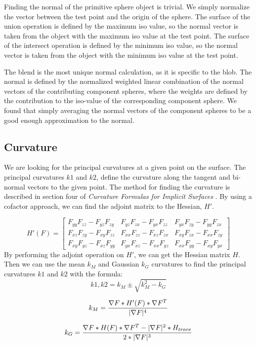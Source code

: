 \documentclass[conference]{acmsiggraph}
\begin{document}
Finding the normal of the primitive sphere object is trivial. We simply
normalize the vector between the test point and the origin of the sphere. The
surface of the union operation is defined by the maximum iso value, so the
normal vector is taken from the object with the maximum iso value at the test
point. The surface of the intersect operation is defined by the minimum iso
value, so the normal vector is taken from the object with the minimum iso value
at the test point.

The blend is the most unique normal calculation, as it is specific to the blob.
The normal is defined by the normalized weighted linear combination of the
normal vectors of the contributing component spheres, where the weights are
defined by the contribution to the iso-value of the corresponding component
sphere\cite{Wyvill}. We found that simply averaging the normal vectors of the
component spheres to be a good enough approximation to the normal.

\subsection{Curvature}
We are looking for the principal curvatures at a given point on the surface.
The principal curvatures $k1$ and $k2$, define the curvature along the tangent
and bi-normal vectors to the given point. The method for finding the curvature
is described in section four of \textit{Curvature Formulas for Implicit
Surfaces} \cite{Goldman2005}. By using a cofactor approach, we can find the adjoint matrix to the
Hessian, $H'$.

$$
H'(F) =
\begin{bmatrix}
	F_{yy}F_{zz} - F_{yz}F_{zy} & F_{yz}F_{zx} - F_{yx}F_{zz} & F_{yx}F_{zy} - F_{yy}F_{zx} \\
	F_{xz}F_{zy} - F_{xy}F_{zz} & F_{xx}F_{zz} - F_{xz}F_{zx} & F_{xy}F_{zx} - F_{xx}F_{zy} \\
	F_{xy}F_{yz} - F_{xz}F_{yy} & F_{yx}F_{xz} - F_{xx}F_{yz} & F_{xx}F_{yy} - F_{xy}F_{yx}
\end{bmatrix}
$$
By performing the adjoint operation on $H'$, we can get the
Hessian matrix $H$. Then we can use the mean $k_M$ and Gaussian $k_G$
curvatures to find
the principal curvatures $k1$ and $k2$ with the formula:
$$k1, k2 = k_M \pm \sqrt{k^2_{M} - k_G}$$

$$k_M = {\nabla F * H'(F) * \nabla F^T \over |\nabla F|^4}$$

$$k_G = {\nabla F * H(F) * \nabla F^T - |\nabla F|^2 * H_{trace} \over 2 *
|\nabla F|^3}$$
\end{document}
